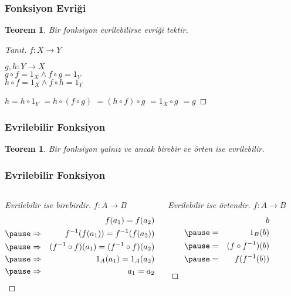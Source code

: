 \documentclass[dvipsnames]{beamer}
\theoremstyle{definition}
\theoremstyle{example}
\theoremstyle{plain}
\newtheorem{teorem}[theorem]{Teorem}
\begin{document}
\begin{frame}
  \frametitle{Fonksiyon Evriği}

  \begin{teorem}
    Bir fonksiyon evrilebilirse evriği tektir.
  \end{teorem}

  \pause
  \begin{proof}[Tanıt]
    $f: X \rightarrow Y$

    \pause
    \medskip
    $g,h: Y \rightarrow X$\\
    $g \circ f = 1_X \wedge f \circ g = 1_Y$\\
    $h \circ f = 1_X \wedge f \circ h = 1_Y$

    \pause
    \medskip
    $h = h \circ 1_Y$
    \pause
    $ = h \circ (f \circ g)$
    \pause
    $ = (h \circ f) \circ g$
    \pause
    $ = 1_X \circ g$
    \pause
    $ = g$
  \end{proof}
\end{frame}

\begin{frame}
  \frametitle{Evrilebilir Fonksiyon}

  \begin{teorem}
    Bir fonksiyon yalnız ve ancak birebir ve örten ise evrilebilir.
  \end{teorem}
\end{frame}

\begin{frame}
  \frametitle{Evrilebilir Fonksiyon}

  \begin{columns}[t]
    \begin{proof}[Evrilebilir ise birebirdir]
      $f: A \rightarrow B$
      \begin{eqnarray*}
        &             & f(a_1) = f(a_2)\\\pause
        & \Rightarrow & f^{-1}(f(a_1)) = f^{-1}(f(a_2))\\\pause
        & \Rightarrow & (f^{-1} \circ f) (a_1) = (f^{-1} \circ f) (a_2)\\\pause
        & \Rightarrow & 1_A (a_1) = 1_A (a_2)\\\pause
        & \Rightarrow & a_1 = a_2
      \end{eqnarray*}
    \end{proof}

    \pause
    \begin{proof}[Evrilebilir ise örtendir]
      $f: A \rightarrow B$
      \begin{eqnarray*}
        &   & b\\\pause
        & = & 1_B (b)\\\pause
        & = & (f \circ f^{-1}) (b)\\\pause
        & = & f(f^{-1} (b))
      \end{eqnarray*}
    \end{proof}
  \end{columns}
\end{frame}
\end{document}
